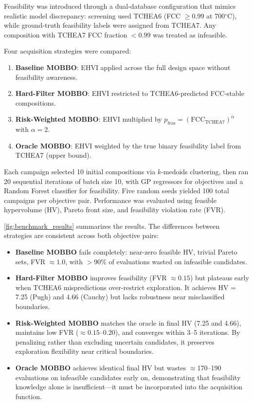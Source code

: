 \documentclass[preprint,12pt,times]{elsarticle}  %
\begin{document}
Feasibility was introduced through a dual-database configuration that mimics realistic model discrepancy: screening used TCHEA6 (FCC $\geq 0.99$ at 700$^\circ$C), while ground-truth feasibility labels were assigned from TCHEA7. Any composition with TCHEA7 FCC fraction $<0.99$ was treated as infeasible.

Four acquisition strategies were compared:

\begin{enumerate}
    \item \textbf{Baseline MOBBO}: EHVI applied across the full design space without feasibility awareness.
    \item \textbf{Hard-Filter MOBBO}: EHVI restricted to TCHEA6-predicted FCC-stable compositions.
    \item \textbf{Risk-Weighted MOBBO}: EHVI multiplied by $p_{\text{feas}} = (\text{FCC}_{\text{TCHEA7}})^{\alpha}$ with $\alpha = 2$.
    \item \textbf{Oracle MOBBO}: EHVI weighted by the true binary feasibility label from TCHEA7 (upper bound).
\end{enumerate}

Each campaign selected 10 initial compositions via $k$-medoids clustering, then ran 20 sequential iterations of batch size 10, with GP regressors for objectives and a Random Forest classifier for feasibility. Five random seeds yielded 100 total campaigns per objective pair. Performance was evaluated using feasible hypervolume (HV), Pareto front size, and feasibility violation rate (FVR).

\autoref{fig:benchmark_results} summarizes the results. The differences between strategies are consistent across both objective pairs:



\begin{itemize}

\item \textbf{Baseline MOBBO} fails completely: near-zero feasible HV, trivial Pareto sets, FVR $\approx 1.0$, with $>$90\% of evaluations wasted on infeasible candidates.

\item \textbf{Hard-Filter MOBBO} improves feasibility (FVR $\approx 0.15$) but plateaus early when TCHEA6 mispredictions over-restrict exploration. It achieves HV = 7.25 (Pugh) and 4.66 (Cauchy) but lacks robustness near misclassified boundaries.

\item \textbf{Risk-Weighted MOBBO} matches the oracle in final HV (7.25 and 4.66), maintains low FVR ($\approx 0.15$--0.20), and converges within 3--5 iterations. By penalizing rather than excluding uncertain candidates, it preserves exploration flexibility near critical boundaries.

\item \textbf{Oracle MOBBO} achieves identical final HV but wastes $\approx$170--190 evaluations on infeasible candidates early on, demonstrating that feasibility knowledge alone is insufficient---it must be incorporated into the acquisition function.

\end{itemize}
\end{document}
